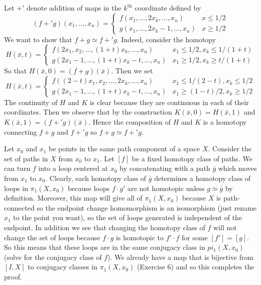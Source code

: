 \documentclass{article}
\newcommand{\exercise}[1]{\noindent{\textbf{Exercise #1:}}}
\begin{document}
Let $+'$ denote addition of maps in the $k^{\text{th}}$ coordinate
defined by
\[
(f+'g)(x_1,\ldots,x_n) =
\begin{cases}
  f(x_1,\ldots,2x_k,\ldots,x_n) & x \leq 1/2 \\
  g(x_1,\ldots,2x_k-1,\ldots,x_n) & x\geq 1/2
\end{cases}
\]
We want to show that $f+g \simeq f+'g$. Indeed, consider the homotopy
\[
H(\bar{x},t) =
\begin{cases}
  f(2x_1,x_2,\ldots,(1+t)x_k,\ldots,x_n) & x_1 \leq 1/2, x_k \leq 1/(1+t) \\
  g(2x_1-1,\ldots, (1+t)x_k-t,\ldots,x_n) & x_1 \geq 1/2, x_k \geq
  t/(1+t)
\end{cases}
\]
So that $H(\bar{x},0) = (f+g)(\bar{x})$. Then we set
\[
H(\bar{x},t) =
\begin{cases}
  f((2-t)x_1,x_2,\ldots,2x_k,\ldots,x_n) & x_1 \leq 1/(2-t), x_k \leq 1/2 \\
  g(2x_1-1,\ldots, (1+t)x_k-t,\ldots,x_n) & x_1 \geq (1-t)/2, x_k \geq 1/2
\end{cases}
\]
The continuity of $H$ and $K$ is clear because they are continuous in
each of their coordinates. Then we observe that by the construction
$K(\bar{x},0) = H(\bar{x},1)$ and $K(\bar{x}, 1) =
(f+'g)(\bar{x})$. Hence the composition of $H$ and $K$ is a homotopy
connecting $f+g$ and $f+'g$ so $f+g \simeq f+'g$.

\exercise{A1}

Let $x_0$ and $x_1$ be points in the same path component of a space
$X$. Consider the set of paths in $X$ from $x_0$ to $x_1$. Let $[f]$
be a fixed homotopy class of paths. We can turn $f$ into a loop
centered at $x_0$ by concatenating with a path $\bar{g}$ which moves
from $x_1$ to $x_0$. Clearly, each homotopy class of $\bar{g}$
determines a homotopy class of loops in $\pi_1(X,x_0)$ because loops
$f\cdot g'$ are not homotopic unless $g \simeq \bar{g}$ by
definition. Moreover, this map will give all of $\pi_1(X,x_0)$ because
$X$ is path-connected so the endpoint change homomorphism is an
isomorphism (just rename $x_1$ to the point you want), so the set of
loops generated is independent of the endpoint. In addition we see
that changing the homotopy class of $f$ will not change the set of
loops because $f\cdot g$ is homotopic to $f'\cdot f$ for some $[f'] =
[g]$. So this means that these loops are in the same conjugacy class
in $pi_1(X,x_0)$ (solve for the conjugacy class of $f$). We already
have a map that is bijective from $[I,X]$ to conjugacy classes in
$\pi_1(X,x_0)$ (Exercise 6) and so this completes the proof.
\end{document}
